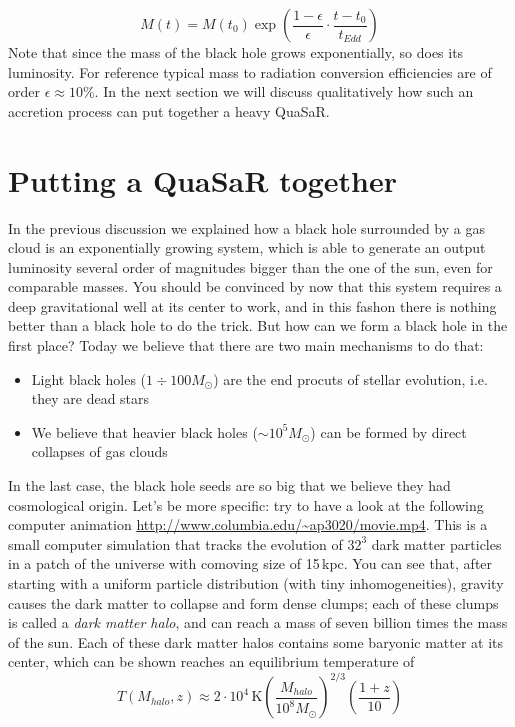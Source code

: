 \begin{equation}
M(t) = M(t_0)\exp{\left(\frac{1-\epsilon}{\epsilon}\cdot\frac{t-t_0}{t_{Edd}}\right)}
\end{equation}
Note that since the mass of the black hole grows exponentially, so does its luminosity. For reference typical mass to radiation conversion efficiencies are of order $\epsilon \approx 10\%$. In the next section we will discuss qualitatively how such an accretion process can put together a heavy QuaSaR. 

\section{Putting a QuaSaR together}
In the previous discussion we explained how a black hole surrounded by a gas cloud is an exponentially growing system, which is able to generate an output luminosity several order of magnitudes bigger than the one of the sun, even for comparable masses. You should be convinced by now that this system requires a deep gravitational well at its center to work, and in this fashon there is nothing better than a black hole to do the trick. But how can we form a black hole in the first place? Today we believe that there are two main mechanisms to do that:
\begin{itemize}
\item Light black holes ($1 \div 100 M_\odot$) are the end procuts of stellar evolution, i.e. they are dead stars
\item We believe that heavier black holes ($\sim 10^5 M_\odot$) can be formed by direct collapses of gas clouds
\end{itemize}
In the last case, the black hole seeds are so big that we believe they had cosmological origin. Let's be more specific: try to have a look at the following computer animation \url{http://www.columbia.edu/~ap3020/movie.mp4}. This is a small computer simulation that tracks the evolution of $32^3$ dark matter particles in a patch of the universe with comoving size of 15\,kpc. You can see that, after starting with a uniform particle distribution (with tiny inhomogeneities), gravity causes the dark matter to collapse and form dense clumps; each of these clumps is called a \textit{dark matter halo}, and can reach a mass of seven billion times the mass of the sun. Each of these dark matter halos contains some baryonic matter at its center, which can be shown reaches an equilibrium temperature of 
\begin{equation}
T(M_{halo},z) \approx 2\cdot 10^4\, \mathrm{K}\left(\frac{M_{halo}}{10^8 M_\odot}\right)^{2/3}\left(\frac{1+z}{10}\right)
\end{equation}
